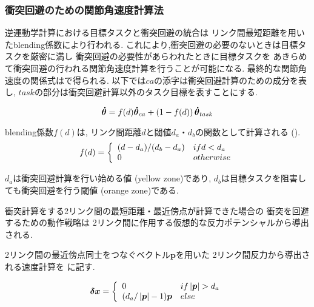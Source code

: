 \subsubsection{衝突回避のための関節角速度計算法}
逆運動学計算における目標タスクと衝突回避の統合は
リンク間最短距離を用いたblending係数により行われる.
これにより,衝突回避の必要のないときは目標タスクを厳密に満し
衝突回避の必要性があらわれたときに目標タスクを
あきらめて衝突回避の行われる関節角速度計算を行うことが可能になる.
最終的な関節角速度の関係式はで得られる.
以下では$ca$の添字は衝突回避計算のための成分を表し,
$task$の部分は衝突回避計算以外のタスク目標を表すことにする.

\begin{equation}
\labeq{collision-avoidance-all}
\bm{\dot{\theta}} = f(d)\bm{\dot{\theta}}_{ca}
+ \left(1-f(d)\right)\bm{\dot{\theta}}_{task}
\end{equation}

blending係数$f(d)$は,
リンク間距離$d$と閾値$d_a$・$d_b$の関数として計算される
().
\begin{eqnarray}
\labeq{collision-avoidance-blending-coefficient}
 f(d) =
  \left\{
   \begin{array}{l l}
     (d-d_a)/(d_b-d_a) & if d<d_a\\
     0 & otherwise
    \end{array}
  \right.
\end{eqnarray}

$d_a$は衝突回避計算を行い始める値
(yellow zone)であり,
$d_b$は目標タスクを阻害しても衝突回避を行う閾値
(orange zone)である.


衝突計算をする2リンク間の最短距離・最近傍点が計算できた場合の
衝突を回避するための動作戦略は
2リンク間に作用する仮想的な反力ポテンシャルから導出される.

2リンク間の最近傍点同士をつなぐベクトル$\bm{p}$を用いた
2リンク間反力から導出される速度計算を
に記す.

\begin{eqnarray}
  \labeq{collision-avoidance-distance-force}
  \bm{\delta x} =
  \left\{
   \begin{array}{l l}
     0 & if \left|\bm{p}\right|>d_{a}\\
     (d_{a}/\left|\bm{p}\right|-1)\bm{p} & else
    \end{array}
  \right.
\end{eqnarray}


